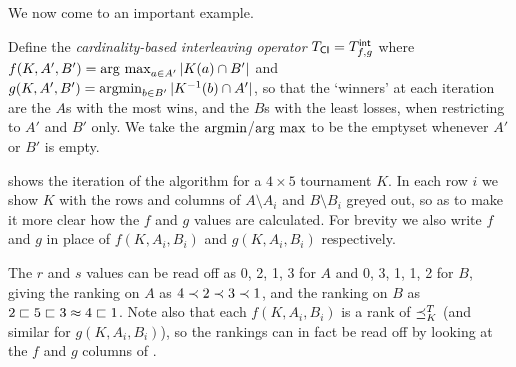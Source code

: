 We now come to an important example.

\begin{example}
    \label{tourn_ex_cardint}

    Define the \emph{cardinality-based interleaving operator} ${T_{\mathsf{CI}}} =
    {T_{f,g}^\mathsf{int}}$ where $f(K, A', B') = \operatorname*{arg\ max}_{a \in A'}{|K(a) \cap B'|}$ and
    \\  %
    $g(K, A', B') = \operatorname{argmin}_{b \in B'}{|K^{-1}(b) \cap A'|}$, so that the
    `winners' at each iteration are the $A$s with the most wins, and the $B$s
    with the least losses, when restricting to $A'$ and $B'$ only.  We take the
    $\operatorname{argmin}$/$\operatorname*{arg\ max}$ to be the emptyset whenever $A'$ or $B'$ is empty.

     shows the iteration of the algorithm for a $4
    \times 5$ tournament $K$. In each row $i$ we show $K$ with the rows and
    columns of $A \setminus A_i$ and $B \setminus B_i$ greyed out, so as to
    make it more clear how the $f$ and $g$ values are
    calculated.\footnotemark{} For brevity we also write $f$ and $g$ in place
    of $f(K, A_i, B_i)$ and $g(K, A_i, B_i)$ respectively.

    The $r$ and $s$ values can be read off as 0, 2, 1, 3 for $A$ and 0, 3, 1,
    1, 2 for $B$, giving the ranking on $A$ as $4 \prec 2 \prec 3 \prec 1$, and
    the ranking on $B$ as $2 \sqsubset 5 \sqsubset 3 \approx 4 \sqsubset 1$. Note also that each
    $f(K, A_i, B_i)$ is a rank of $\preceq_K^T$ (and similar for $g(K, A_i,
    B_i)$), so the rankings can in fact be read off by looking at the $f$ and
    $g$ columns of .


\end{example}

